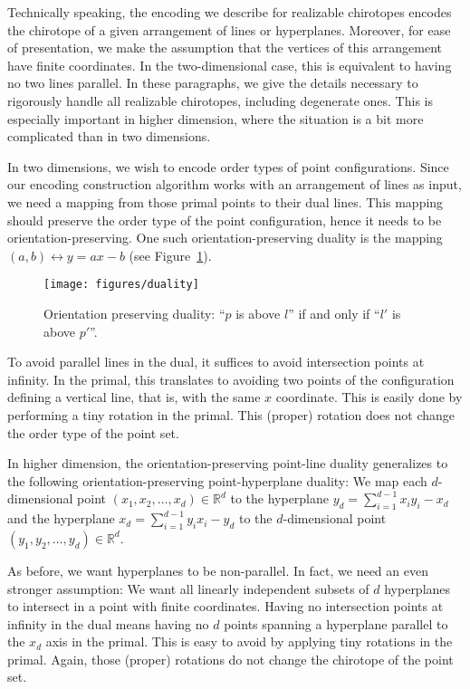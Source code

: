 
Technically speaking, the encoding we describe for realizable chirotopes
encodes the chirotope of a given arrangement of lines or hyperplanes.
Moreover, for ease of presentation, we make the assumption that the vertices of
this arrangement have finite coordinates. In the two-dimensional case, this
is equivalent to having no two lines parallel. In these paragraphs, we give the
details necessary to rigorously handle all realizable chirotopes, including
degenerate ones. This is especially important in higher dimension, where the
situation is a bit more complicated than in two dimensions.

In two dimensions, we wish to encode order types of point configurations.
Since our encoding construction algorithm works with an arrangement of lines as
input, we need a mapping from those primal points to their dual lines. This
mapping should preserve the order type of the point configuration, hence it
needs to be orientation-preserving. One such orientation-preserving duality is
the mapping \((a,b) \leftrightarrow y = ax - b\) (see Figure~\ref{fig:duality}).

\begin{figure}
  \centering{}
  \texttt{[image: figures/duality]}
  \caption{Orientation preserving duality: ``\(p\) is above \(l\)'' if and only if
  ``\(l'\) is above \(p'\)''.}\label{fig:duality}
\end{figure}

To avoid parallel lines in the dual, it suffices to avoid intersection points
at infinity. In the primal, this translates to avoiding two points of the
configuration defining a vertical line, that is, with the same \(x\) coordinate.
This is easily done by performing a tiny rotation in the primal.
This (proper) rotation does not change the order type of the point set.

In higher dimension, the orientation-preserving point-line duality generalizes
to the following orientation-preserving point-hyperplane duality: We map each
\(d\)-dimensional point \((x_1, x_2, \ldots, x_d) \in \mathbb{R}^d\) to the hyperplane \(y_d =
\sum_{i=1}^{d-1} x_i y_i - x_d \) and the hyperplane \(x_d = \sum_{i=1}^{d-1}
y_i x_i - y_d \) to the \(d\)-dimensional point \(( y_1, y_2, \ldots, y_d) \in
\mathbb{R}^d\).

As before, we want hyperplanes to be non-parallel. In fact, we need an even
stronger assumption: We want all linearly independent subsets of \(d\)
hyperplanes to intersect in a point with finite coordinates.
%
Having no intersection points at infinity in the dual
means having no \(d\) points spanning a hyperplane parallel to the
\(x_d\) axis in the primal. This is easy to avoid by applying tiny rotations
in the primal. Again, those (proper) rotations do not change the chirotope of the
point set.

